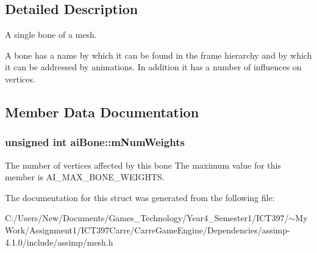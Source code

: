 \subsection{Detailed Description}
A single bone of a mesh. 

A bone has a name by which it can be found in the frame hierarchy and by which it can be addressed by animations. In addition it has a number of influences on vertices. 

\subsection{Member Data Documentation}
\hypertarget{structai_bone_87a79d42a0132753aac66397ad6f9b71}{
\subsubsection[mNumWeights]{\setlength{\rightskip}{0pt plus 5cm}unsigned int {\bf aiBone::mNumWeights}}}
\label{structai_bone_87a79d42a0132753aac66397ad6f9b71}


The number of vertices affected by this bone The maximum value for this member is AI\_\-MAX\_\-BONE\_\-WEIGHTS. 

The documentation for this struct was generated from the following file:\begin{CompactItemize}
\item 
C:/Users/New/Documents/Games\_\-Technology/Year4\_\-Semester1/ICT397/$\sim$My Work/Assignment1/ICT397Carre/CarreGameEngine/Dependencies/assimp-4.1.0/include/assimp/mesh.h\end{CompactItemize}

